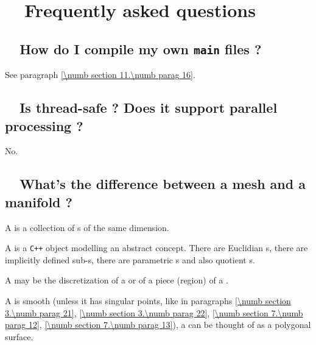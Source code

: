 
\chapter {~~{Frequently asked questions}}\label{\numb section 13}

\section{~~How do I compile my own {\tt main} files ?}\label{\numb section 13.\numb parag 1}

See paragraph \ref{\numb section 11.\numb parag 16}.


\section{~~Is {\maniFEM} thread-safe ? Does it support parallel processing ?}
\label{\numb section 13.\numb parag 2}

No.


\section{~~What's the difference between a mesh and a manifold ?}
\label{\numb section 13.\numb parag 3}

A {\small\tt{}} is a collection of {\small\tt{}}s of the
same dimension.

A {\small\tt{}} is a {\tt C++} object modelling an abstract concept.
There are Euclidian {\small\tt{}}s, there are implicitly defined
sub-{\small\tt{}}s, there are parametric {\small\tt{}}s
and also quotient {\small\tt{}}s.

A {\small\tt{}} may be the discretization of a {\small\tt{}}
or of a piece (region) of a {\small\tt{}}.

A {\small\tt{}} is smooth (unless it has singular points, like in 
paragraphs \ref{\numb section 3.\numb parag 21}, \ref{\numb section 3.\numb parag 22},
\ref{\numb section 7.\numb parag 12}, \ref{\numb section 7.\numb parag 13}),
a {\small\tt{}} can be thought of as a polygonal surface.

